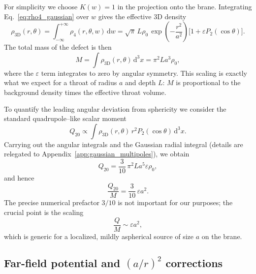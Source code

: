 \documentclass[12pt]{article}
\begin{document}
For simplicity we choose $K(w)=1$ in the projection onto the brane.
Integrating Eq.~\eqref{eq:rho4_gaussian} over $w$ gives the effective 3D
density
\begin{equation}
  \rho_{\mathrm{3D}}(r,\theta)
  = \int_{-\infty}^{+\infty}
    \rho_4(r,\theta,w)\,\mathrm{d}w
  = \sqrt{\pi}\,L\rho_0\,\exp\!\left(-\frac{r^2}{a^2}\right)
    \big[1 + \varepsilon P_2(\cos\theta)\big].
  \label{eq:rho3d_gaussian}
\end{equation}
The total mass of the defect is then
\begin{equation}
  M
  = \int \rho_{\mathrm{3D}}(r,\theta)\,\mathrm{d}^3x
  = \pi^2 L a^3 \rho_0,
  \label{eq:gaussian_mass}
\end{equation}
where the $\varepsilon$ term integrates to zero by angular symmetry.
This scaling is exactly what we expect for a throat of radius $a$ and depth
$L$: $M$ is proportional to the background density times the effective
throat volume.

To quantify the leading angular deviation from sphericity we consider the
standard quadrupole--like scalar moment
\begin{equation}
  Q_{20}
  \propto \int \rho_{\mathrm{3D}}(r,\theta)\,
           r^2 P_2(\cos\theta)\,\mathrm{d}^3x.
  \label{eq:q20_def}
\end{equation}
Carrying out the angular integrals and the Gaussian radial integral (details
are relegated to Appendix~\ref{app:gaussian_multipoles}), we obtain
\begin{equation}
  Q_{20}
  = \frac{3}{10}\,\pi^2 L a^5 \varepsilon \rho_0,
  \label{eq:q20_result}
\end{equation}
and hence
\begin{equation}
  \frac{Q_{20}}{M}
  = \frac{3}{10}\,\varepsilon a^2.
  \label{eq:q_over_m_scaling}
\end{equation}
The precise numerical prefactor $3/10$ is not important for our purposes;
the crucial point is the scaling
\begin{equation}
  \frac{Q}{M} \sim \varepsilon a^2,
\end{equation}
which is generic for a localized, mildly aspherical source of size $a$ on
the brane.

\subsection{Far-field potential and \texorpdfstring{$(a/r)^2$}{(a/r) squared} corrections}
\label{subsec:far_field_potential}
\end{document}
